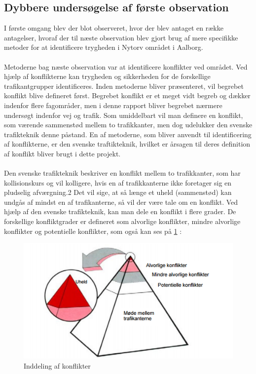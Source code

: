 \subsection{Dybbere undersøgelse af første observation}
\label{sub:dyb_undersoelse}
I første omgang blev der blot observeret, hvor der blev antaget en række antagelser, hvoraf der til næste observation blev gjort brug af mere specifikke metoder for at identificere trygheden i Nytorv området i Aalborg.
\\\\
Metoderne bag næste observation var at identificere konflikter ved området. Ved hjælp af konflikterne kan trygheden og sikkerheden for de forskellige trafikantgrupper identificeres. Inden metoderne bliver præsenteret, vil begrebet konflikt blive defineret først. Begrebet konflikt er et meget vidt begreb og dækker indenfor flere fagområder, men i denne rapport bliver begrebet nærmere undersøgt indenfor vej og trafik. Som umiddelbart vil man definere en konflikt, som værende sammenstød mellem to trafikkanter, men dog udelukker den svenske trafikteknik denne påstand.%
En af metoderne, som bliver anvendt til identificering af konflikterne, er den svenske traftikteknik, hvilket er årsagen til deres definition af konflikt bliver brugt i dette projekt.
\\\\
Den svenske trafikteknik beskriver en konflikt mellem to trafikkanter, som har kollisionskurs og vil kolligere, hvis en af trafikkanterne ikke foretager sig en pludselig afværgning.2 Det vil sige, at så længe et uheld (sammenstød) kan undgås af mindst en af trafikanterne, så vil der være tale om en konflikt. Ved hjælp af den svenske trafikteknik, kan man dele en konflikt i flere grader. De forskellige konfliktgrader er defineret som alvorlige konflikter, mindre alvorlige konflikter og potentielle konflikter, som også kan ses på \cref{fig:indellingkonflikter} :
 \begin{figure}[htbp]
   \label{fig:indellingkonflikter}
   \centering
   \begin{adjustbox}{max width=\textwidth}
     \includegraphics{billederogfigur/konflikt.png} %
  \end{adjustbox}
   \caption{Inddeling af konflikter}
 \end{figure}
\newpage


